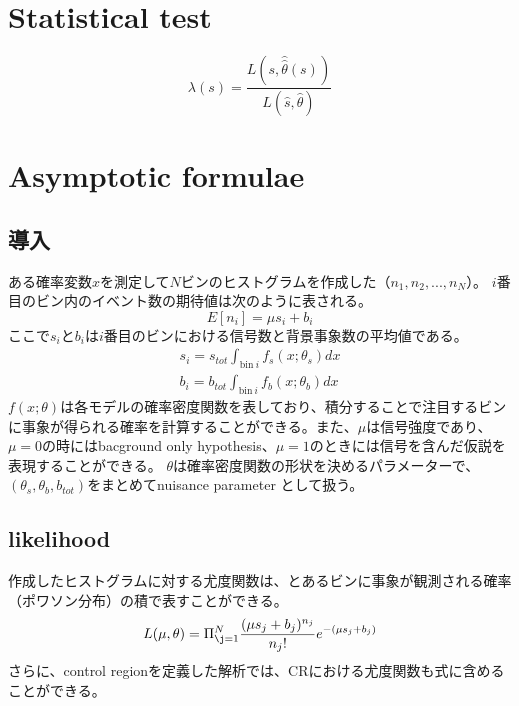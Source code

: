 \documentclass[oneside, uplatex]{jsbook}
\begin{document}
\section{Statistical test}

\begin{equation}
  \lambda(s) = \frac{L(s,\hat{\hat{\theta}}(s))}{L(\hat{s},\hat{\theta})}
\end{equation}


\section{Asymptotic formulae}
\subsection{導入}
ある確率変数$x$を測定して$N$ビンのヒストグラムを作成した（$n_1,n_2,...,n_N$）。
$i$番目のビン内のイベント数の期待値は次のように表される。
\begin{equation}
E[n_i] = \mu s_i + b_i
\end{equation}
ここで$s_i$と$b_i$は$i$番目のビンにおける信号数と背景事象数の平均値である。
\begin{eqnarray}
 s_i = s_{tot}\int_{\mathrm{bin}~i}f_s(x;\theta_s)dx \\
 b_i = b_{tot}\int_{\mathrm{bin}~i}f_b(x;\theta_b)dx
\end{eqnarray}
$f(x;\theta)$は各モデルの確率密度関数を表しており、積分することで注目するビンに事象が得られる確率を計算することができる。また、$\mu$は信号強度であり、$\mu=0$の時にはbacground only hypothesis、$\mu=1$のときには信号を含んだ仮説を表現することができる。
$\theta$は確率密度関数の形状を決めるパラメーターで、$(\theta_s,\theta_b,b_{tot})$をまとめてnuisance parameter として扱う。

\subsection{likelihood}
作成したヒストグラムに対する尤度関数は、とあるビンに事象が観測される確率（ポワソン分布）の積で表すことができる。
\begin{equation}
    L(\mu, \theta) = \Pi_{\j=1}^{N} \frac{(\mu s_j + b_j)^{n_j}}{n_j!}e^{-(\mu s_j + b_j)}
\end{equation}
さらに、control regionを定義した解析では、CRにおける尤度関数も式に含めることができる。
\end{document}
